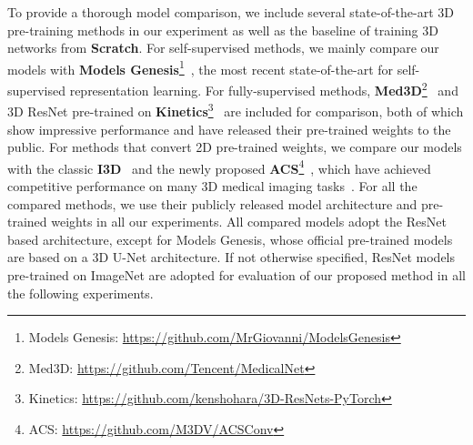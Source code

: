 \documentclass[journal,twoside,web]{ieeecolor}
\begin{document}
To provide a thorough model comparison, we include several state-of-the-art 3D pre-training methods in our experiment as well as the baseline of training 3D networks from \textbf{Scratch}. For self-supervised methods, we mainly compare our models with \textbf{Models Genesis}\footnote{Models Genesis: \href{https://github.com/MrGiovanni/ModelsGenesis}{https://github.com/MrGiovanni/ModelsGenesis}}~\cite{zhou2020models}, the most recent state-of-the-art for self-supervised representation learning. For fully-supervised methods, \textbf{Med3D}\footnote{Med3D: \href{https://github.com/Tencent/MedicalNet}{https://github.com/Tencent/MedicalNet}}~\cite{chen2019med3d} and 3D ResNet pre-trained on \textbf{Kinetics}\footnote{Kinetics: \href{https://github.com/kenshohara/3D-ResNets-PyTorch}{https://github.com/kenshohara/3D-ResNets-PyTorch}}~\cite{carreira2017quo} are included for comparison, both of which show impressive performance and have released their pre-trained weights to the public. For methods that convert 2D pre-trained weights, we compare our models with the classic \textbf{I3D}~\cite{carreira2017quo} and the newly proposed \textbf{ACS}\footnote{ACS: \href{https://github.com/M3DV/ACSConv}{https://github.com/M3DV/ACSConv}}~\cite{yang2019reinventing}, which have achieved competitive performance on many 3D medical imaging tasks~\cite{cai2020deep}. For all the compared methods, we use their publicly released model architecture and pre-trained weights in all our experiments. All compared models adopt the ResNet based architecture, except for Models Genesis, whose official pre-trained models are based on a 3D U-Net architecture. If not otherwise specified, ResNet models pre-trained on ImageNet are adopted for evaluation of our proposed method in all the following experiments.
\end{document}

